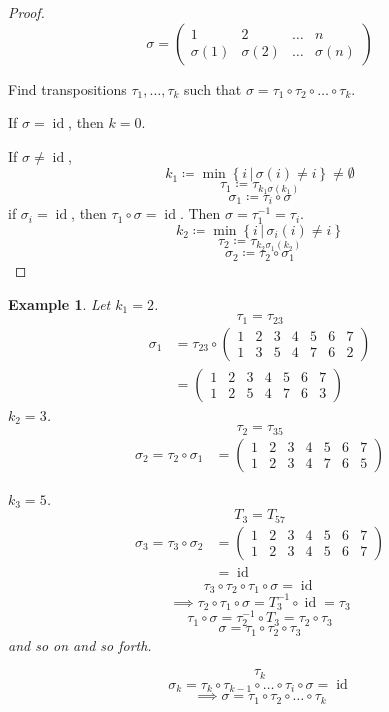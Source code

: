 \documentclass[a4paper]{article}
\numberwithin{lecref}{section}
\newtheorem*{Example}{Example}
\newcommand{\setdef}[2]{\left\{\left.#1\,\right|\,#2\right\}}
\begin{document}
\begin{proof}
  \[ \sigma = \begin{pmatrix} 1 & 2 & \dots & n \\ \sigma(1) & \sigma(2) & \dots & \sigma(n) \end{pmatrix} \]

  Find transpositions $\tau_1, \dots, \tau_k$ such that $\sigma = \tau_1 \circ \tau_2 \circ \dots \circ \tau_k$.

  If $\sigma = \operatorname{id}$, then $k=0$.

  If $\sigma \neq \operatorname{id}$,
  \[ k_1 \coloneqq \min\setdef{i}{\sigma(i) \neq i} \neq \emptyset \]
  \[ \tau_1 \coloneqq \tau_{k_1 \sigma(k_1)} \]
  \[ \sigma_1 \coloneqq \tau_i \circ \sigma \]
  if $\sigma_i = \operatorname{id}$, then $\tau_1 \circ \sigma = \operatorname{id}$. Then $\sigma = \tau_1^{-1} = \tau_i$.
  \[ k_2 \coloneqq \min\setdef{i}{\sigma_i(i) \neq i} \]
  \[ \tau_2 \coloneqq \tau_{k_2 \sigma_1(k_2)} \]
  \[ \sigma_2 \coloneqq \tau_2 \circ \sigma_1 \]
\end{proof}

\begin{Example}
  Let $k_1 = 2$.
  \[ \tau_1 = \tau_{23} \]
  \begin{align*}
    \sigma_1 &= \tau_{23} \circ \begin{pmatrix} 1 & 2 & 3 & 4 & 5 & 6 & 7 \\ 1 & 3 & 5 & 4 & 7 & 6 & 2 \end{pmatrix} \\
      &= \begin{pmatrix} 1 & 2 & 3 & 4 & 5 & 6 & 7 \\ 1 & 2 & 5 & 4 & 7 & 6 & 3 \end{pmatrix}
  \end{align*}
  $k_2 = 3$.
  \[ \tau_2 = \tau_{35} \]
  \begin{align*}
    \sigma_2 = \tau_2 \circ \sigma_1 &= \begin{pmatrix} 1 & 2 & 3 & 4 & 5 & 6 & 7 \\ 1 & 2 & 3 & 4 & 7 & 6 & 5 \end{pmatrix}
  \end{align*}

  $k_3 = 5$.
  \[ T_3 = T_{57} \]
  \begin{align*}
    \sigma_3 = \tau_3 \circ \sigma_2 &= \begin{pmatrix} 1 & 2 & 3 & 4 & 5 & 6 & 7 \\ 1 & 2 & 3 & 4 & 5 & 6 & 7 \end{pmatrix} \\
      &= \operatorname{id}
  \end{align*}
  \[ \tau_3 \circ \tau_2 \circ \tau_1 \circ \sigma = \operatorname{id} \]
  \[ \implies \tau_2 \circ \tau_1 \circ \sigma = T_3^{-1} \circ \operatorname{id} = \tau_3 \]
  \[ \tau_1 \circ \sigma = \tau_2^{-1} \circ T_3 = \tau_2 \circ \tau_3 \]
  \[ \sigma = \tau_1 \circ \tau_2 \circ \tau_3 \]
  and so on and so forth.

  \[ \tau_k \]
  \[ \sigma_k = \tau_k \circ \tau_{k-1} \circ \dots \circ \tau_{i} \circ \sigma = \operatorname{id} \]
  \[ \implies \sigma = \tau_1 \circ \tau_2 \circ \dots \circ \tau_k \]
\end{Example}
\end{document}
